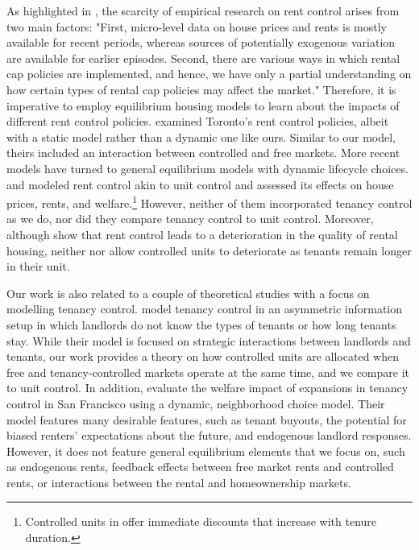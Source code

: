 \documentclass[parskip=full]{article}
\begin{document}
As highlighted in \citet{mm-2023}, the scarcity of empirical research on rent control arises from two main factors: "First, micro-level data on house prices and rents is mostly available for recent periods, whereas sources of potentially exogenous variation are available for earlier episodes. Second, there are various ways in which rental cap policies are implemented, and hence, we have only a partial understanding on how certain types of rental cap policies may affect the market." Therefore, it is imperative to employ equilibrium housing models to learn about the impacts of different rent control policies. \citet{fallis-1985} examined Toronto's rent control policies, albeit with a static model rather than a dynamic one like ours. Similar to our model, theirs included an interaction between controlled and free markets. More recent models have turned to general equilibrium models with dynamic lifecycle choices. \citet{eric-1995} and \citet{fmn-2023} modeled rent control akin to unit control and assessed its effects on house prices, rents, and welfare.\footnote{Controlled units in \citet{fmn-2023} offer immediate discounts that increase with tenure duration.} However, neither of them incorporated tenancy control as we do, nor did they compare tenancy control to unit control. Moreover, although \citet{ms-1993} show that rent control leads to a deterioration in the quality of rental housing, neither \citet{eric-1995} nor \citet{fmn-2023} allow controlled units to deteriorate as tenants remain longer in their unit. 

Our work is also related to a couple of theoretical studies with a focus on modelling tenancy control. \citet{be-2000} model tenancy control in an asymmetric information setup in which landlords do not know the types of tenants or how long tenants stay. While their model is focused on strategic interactions between landlords and tenants, our work provides a theory on how controlled units are allocated when free and tenancy-controlled markets operate at the same time, and we compare it to unit control. In addition, \citet{diamond-2019} evaluate the welfare impact of expansions in tenancy control in San Francisco using a dynamic, neighborhood choice model. Their model features many desirable features, such as tenant buyouts, the potential for biased renters' expectations about the future, and endogenous landlord responses. However, it does not feature general equilibrium elements that we focus on, such as endogenous rents, feedback effects between free market rents and controlled rents, or interactions between the rental and homeownership markets.
\end{document}
